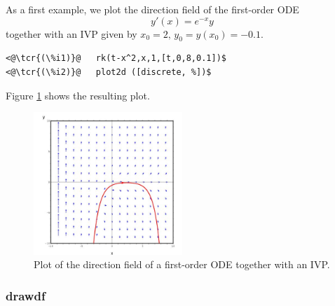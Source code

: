 \documentclass[../Maxima_Workbook.tex]{subfiles}
\begin{document}
\lz As a first example, we plot the direction field of the first-order ODE
\begin{equation*}
	y'(x)= e^{-x} y
\end{equation*}
together with an IVP given by $ x_0=2, \, y_0=y(x_0)=-0.1 $.

\lz \begin{small}
\color{blue}
\begin{lstlisting}
<@\tcr{(\%i1)}@   rk(t-x^2,x,1,[t,0,8,0.1])$
<@\tcr{(\%i2)}@   plot2d ([discrete, %])$
\end{lstlisting}
\color{black}
\end{small}

\lz Figure \ref{DE-Fig3} shows the resulting plot. 

\begin{figure}
	\centering
	\includegraphics[width=0.5\textwidth]{DE_plotdf1.jpg}
	\caption{Plot of the direction field of a first-order ODE together with an IVP.}
	\label{DE-Fig3}
\end{figure}

\subsubsection{drawdf}
\end{document}
